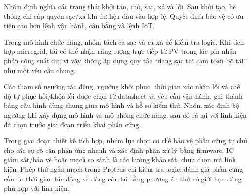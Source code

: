 Nhóm định nghĩa các trạng thái khởi tạo, chờ, sạc, xả và lỗi. Sau khởi tạo, hệ thống chỉ cấp quyền sạc/xả khi dữ liệu đầu vào hợp lệ. Quyết định bảo vệ có ưu tiên cao hơn lệnh vận hành, cân bằng và lệnh IoT.

Trong mô hình chức năng, nhóm tách ca sạc và ca xả để kiểm tra logic. Khi tích hợp microgrid, tải có thể nhận năng lượng trực tiếp từ PV trong lúc pin nhận phần công suất dư; vì vậy không áp dụng quy tắc ``đang sạc thì cấm toàn bộ tải'' như một yêu cầu chung.

Các tham số ngưỡng tác động, ngưỡng khôi phục, thời gian xác nhận lỗi và chế độ tự phục hồi/khóa lỗi được chọn từ datasheet và yêu cầu vận hành, ghi thành bảng cấu hình dùng chung giữa mô hình và hồ sơ kiểm thử. Nhóm xác định bộ ngưỡng khi xây dựng mô hình và mô phỏng chức năng, sau đó rà lại với linh kiện đã chọn trước giai đoạn triển khai phần cứng.

Trong giai đoạn thiết kế tích hợp, nhóm lựa chọn cơ chế bảo vệ phần cứng tự chủ cho các sự cố cần phản ứng nhanh và xác định phần xử lý bằng firmware. IC giám sát/bảo vệ hoặc mạch so sánh là các hướng khảo sát, chưa chọn mã linh kiện. Phép thử ngắn mạch trong Proteus chỉ kiểm tra logic; đánh giá phần cứng cần đo thời gian tác động và dòng còn lại bằng phương án thử có giới hạn dòng phù hợp với linh kiện.
